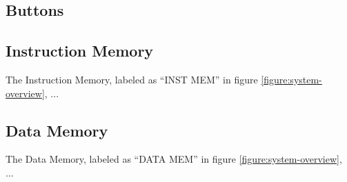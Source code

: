 
\subsection{Buttons}


\subsection{Instruction Memory}

The Instruction Memory, labeled as ``INST MEM'' in figure \vref{figure:system-overview}, ...

\subsection{Data Memory}

The Data Memory, labeled as ``DATA MEM'' in figure \vref{figure:system-overview}, ...


